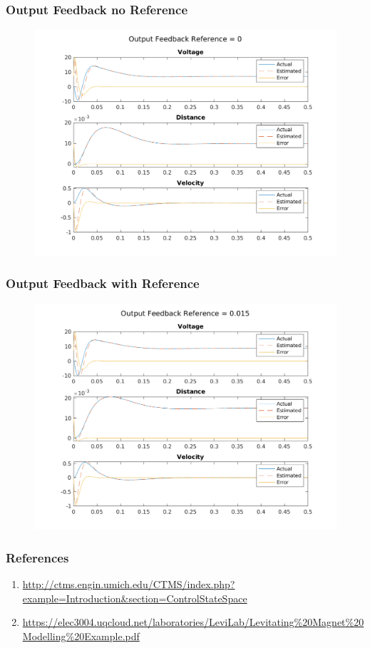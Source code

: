 \documentclass{beamer}
\begin{document}
\begin{frame}
\frametitle{Output Feedback no Reference}
\begin{figure}
\centering
\includegraphics[scale=.5]{images/Output_Feedback_ref_0.png}
\end{figure}
\end{frame}

\begin{frame}
\frametitle{Output Feedback with Reference}
\begin{figure}
\centering
\includegraphics[scale=.5]{images/Output_Feedback_ref_p015.png}
\end{figure}
\end{frame}

\begin{frame}
\frametitle{References}
\begin{enumerate}[1.]
\item \url{http://ctms.engin.umich.edu/CTMS/index.php?example=Introduction\&section=ControlStateSpace}
\item \url{https://elec3004.uqcloud.net/laboratories/LeviLab/Levitating\%20Magnet\%20Modelling\%20Example.pdf}
\end{enumerate}
\end{frame}
\end{document}
